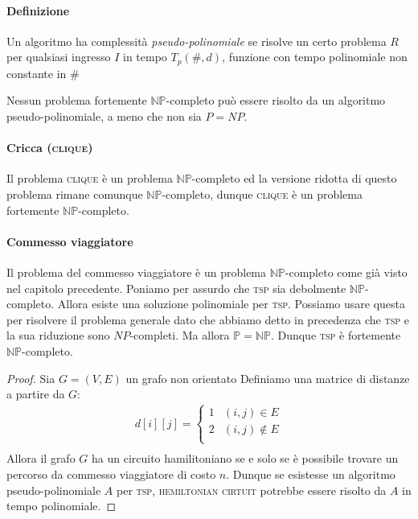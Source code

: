             \paragraph{Definizione} Un algoritmo ha complessità \textit{pseudo-polinomiale} se risolve un certo problema $R$ per qualsiasi ingresso $I$ in tempo $T_p(\#,d)$, funzione con tempo polinomiale non constante in $\#$
            \begin{theorem}
                Nessun problema fortemente $\mathbb{NP}$-completo può essere risolto da un algoritmo pseudo-polinomiale, a meno che non sia $P=NP$.
            \end{theorem}
            \paragraph{Cricca (\textsc{clique})}
                Il problema \textsc{clique} è un problema $\mathbb{NP}$-completo ed la versione ridotta di questo problema rimane comunque $\mathbb{NP}$-completo, dunque \textsc{clique} è un problema fortemente $\mathbb{NP}$-completo. 
            \paragraph{Commesso viaggiatore}
                Il problema del commesso viaggiatore è un problema $\mathbb{NP}$-completo come già visto nel capitolo precedente. Poniamo per assurdo che \textsc{tsp} sia debolmente $\mathbb{NP}$-completo. Allora esiste una soluzione polinomiale per \textsc{tsp}. Possiamo usare questa per risolvere il problema generale dato che abbiamo detto in precedenza che \textsc{tsp} e la sua riduzione sono $NP$-completi. Ma allora $\mathbb{P}=\mathbb{NP}$. Dunque \textsc{tsp} è fortemente $\mathbb{NP}$-completo.
                \begin{proof}
                    Sia $G=(V,E)$ un grafo non orientato\newline
                    Definiamo una matrice di distanze a partire da $G$:
                    \begin{align*}
                        d[i][j] = \begin{cases}
                            1 & (i,j)\in E\\
                            2 & (i,j)\not\in E\\
                        \end{cases}\\
                    \end{align*}
                    Allora il grafo $G$ ha un circuito hamilitoniano se e solo se è possibile trovare un percorso da commesso viaggiatore di costo $n$. Dunque se esistesse un algoritmo pseudo-polinomiale $A$ per \textsc{tsp}, \textsc{hemiltonian cirtuit} potrebbe essere risolto da $A$ in tempo polinomiale.
                \end{proof}

